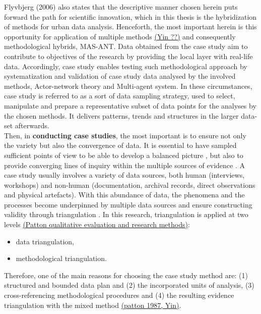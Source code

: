\documentclass[11pt]{report}
\begin{document}
Flyvbjerg (2006) also states that the descriptive manner chosen herein puts forward the path for scientific innovation, which in this thesis is the hybridization of methods for urban data analysis. Henceforth, the most important herein is this opportunity for application of multiple methods \href{ref}{(Yin ??)} and consequently methodological hybrids, MAS-ANT. Data obtained from the case study aim to contribute to objectives of the research by providing the local layer with real-life data.
Accordingly, case study enables testing such methodological approach by systematization and validation of case study data analysed by the involved methods, Actor-network theory and Multi-agent system.
In these circumstances, case study is referred to as a sort of data sampling strategy, used to select, manipulate and prepare a representative subset of data points for the analyses by the chosen methods. It delivers patterns, trends and structures in the larger data-set afterwards.
\\

Then, in \textbf{conducting case studies}, the most important is to ensure not only the variety but also the convergence of data. It is essential to have sampled  sufficient  points  of  view  to be able to develop a balanced picture \cite{(Harrison 2002)}, but also to provide converging lines of inquiry within the multiple sources of evidence \cite{(Yin 2009)}.
A case study usually involves a variety of data sources, both human (interviews, workshops) and non-human (documentation, archival records, direct observations and physical artefacts).
With this abundance of data, the phenomena and the processes become underpinned by multiple data sources and ensure constructing validity through triangulation \cite{(Denzin 1987b}. In this research, triangulation is applied at two levels \href{ref}{(Patton qualitative evaluation and research methods)}:

\begin{itemize}
\item data triangulation,
\item methodological triangulation. 
\end{itemize}

Therefore, one of the main reasons for choosing the case study method are: (1) structured and bounded data plan and (2) the incorporated units of analysis, (3) cross-referencing methodological procedures and (4) the resulting evidence triangulation with the mixed method \href{ref}{(patton 1987, Yin)}.
\\
\end{document}
